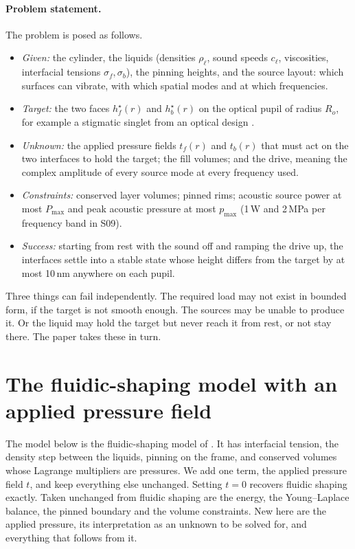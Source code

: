 \documentclass[11pt,a4paper]{article}
\numberwithin{equation}{section}
\begin{document}
\paragraph{Problem statement.} The problem is posed as follows.
\begin{itemize}
 \item \emph{Given:} the cylinder, the liquids (densities $\rho_\ell$, sound
 speeds $c_\ell$, viscosities, interfacial tensions $\sigma_f,\sigma_b$), the
 pinning heights, and the source layout: which surfaces can vibrate, with which
 spatial modes and at which frequencies.
 \item \emph{Target:} the two faces $h_f^\star(r)$ and $h_b^\star(r)$ on the
 optical pupil of radius $R_o$, for example a stigmatic singlet from an optical
 design \cite{silva2020}.
 \item \emph{Unknown:} the applied pressure fields $t_f(r)$ and $t_b(r)$ that
 must act on the two interfaces to hold the target; the fill volumes; and the drive, meaning
 the complex amplitude of every source mode at every frequency used.
 \item \emph{Constraints:} conserved layer volumes; pinned rims; acoustic
 source power at most $P_{\max}$ and peak acoustic pressure at most $p_{\max}$
 (1\,W and 2\,MPa per frequency band in S09).
 \item \emph{Success:} starting from rest with the sound off and ramping the
 drive up, the interfaces settle into a stable state whose height differs from
 the target by at most 10\,nm anywhere on each pupil.
\end{itemize}
Three things can fail independently. The required load may not exist in
bounded form, if the target is not smooth enough. The sources may be unable to
produce it. Or the liquid may hold the target but never reach it from rest, or
not stay there. The paper takes these in turn.

\section{The fluidic-shaping model with an applied pressure field}\label{sec:interface}

The model below is the fluidic-shaping model of
\cite{frumkin2021,elgarisi2021preprint}. It has interfacial tension, the density
step between the liquids, pinning on the frame, and conserved volumes whose
Lagrange multipliers are pressures. We add one term, the applied pressure field
$t$, and keep everything else unchanged. Setting $t=0$ recovers fluidic shaping
exactly. Taken unchanged from fluidic shaping are the energy, the Young--Laplace
balance, the pinned boundary and the volume constraints. New here are the
applied pressure, its interpretation as an unknown to be solved for, and
everything that follows from it.
\end{document}
